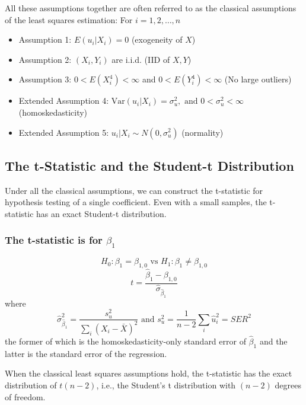 \documentclass[a4paper,11pt]{article}
\newcommand{\var}{\mathrm{Var}}
\begin{document}
All these assumptions together are often referred to as the classical
assumptions of the least squares estimation:
For \(i = 1, 2, \ldots, n\)
\begin{itemize}
\item Assumption 1: \(E(u_i | X_i) = 0\) (exogeneity of \(X\))
\item Assumption 2: \((X_i, Y_i)\) are i.i.d. (IID of \(X, Y\))
\item Assumption 3: \(0 < E(X_i^4) < \infty\) and \(0 < E(Y_i^4) < \infty\)
(No large outliers)
\item Extended Assumption 4: \(\var(u_i | X_i) = \sigma^2_u, \text{ and } 0 <
                   \sigma^2_u < \infty\) (homoskedasticity)
\item Extended Assumption 5: \(u_i | X_i \sim N(0, \sigma^2_u)\) (normality)
\end{itemize}


\subsection{The t-Statistic and the Student-t Distribution}
\label{sec:org63b14ff}

Under all the classical assumptions, we can construct the
t-statistic for hypothesis testing of a single coefficient. Even with
a small samples, the t-statistic has an exact Student-t distribution.

\subsubsection*{The t-statistic is for \(\beta_1\)}
\label{sec:org3558505}

\[H_0: \beta_1 = \beta_{1,0} \text{ vs } H_1: \beta_1 \neq \beta_{1,0}\]
\begin{equation}
t = \frac{\hat{\beta}_1 - \beta_{1,0}}{\hat{\sigma}_{\hat{\beta}_1}}
\end{equation}
where
\begin{equation*}
\hat{\sigma}^2_{\hat{\beta}_1} = \frac{s^2_u}{\sum_i (X_i - \bar{X})^2} \text{ and } s^2_u = \frac{1}{n-2}\sum_i \hat{u}_i^2 = SER^2
\end{equation*}
the former of which is the homoskedasticity-only standard error of
\(\hat{\beta}_1\) and the latter is the standard error of the
regression.

When the classical least squares assumptions hold, the
t-statistic has the exact distribution of \(t(n-2)\), i.e., the
Student's t distribution with \((n-2)\) degrees of freedom.
\end{document}
